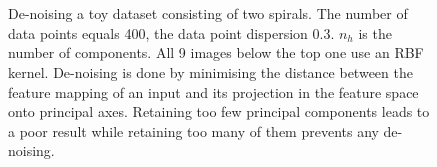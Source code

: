 \begin{figure}[h]
%
\quad
{}\quad
{}\\
%
\quad
{}\quad
{}\\
%
\caption{De-noising a toy dataset consisting of two spirals. The number of data points equals 400, the data point dispersion 0.3. $n_h$ is the number of components. All 9 images below the top one use an RBF kernel. De-noising is done by minimising the distance between the feature mapping of an input and its projection in the feature space onto principal axes. Retaining too few principal components leads to a poor result while retaining too many of them prevents any de-noising.}
\label{kpcatoy}
\end{figure}


